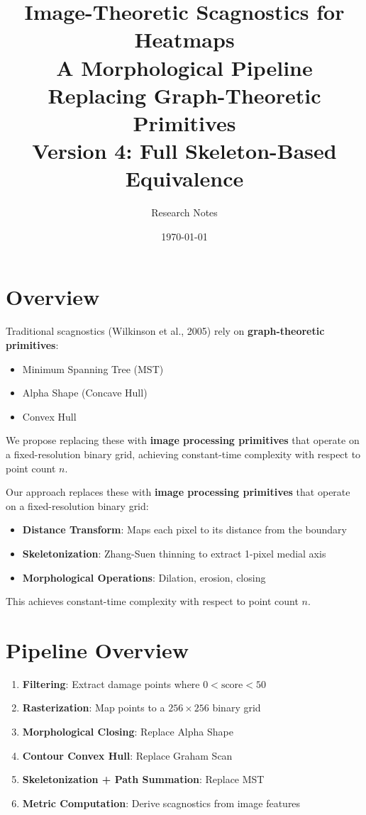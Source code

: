 \documentclass[11pt]{article}
\title{\textbf{Image-Theoretic Scagnostics for Heatmaps}\\[0.5em]
\large A Morphological Pipeline Replacing Graph-Theoretic Primitives\\[0.3em]
\normalsize Version 4: Full Skeleton-Based Equivalence}
\author{Research Notes}
\date{\today}
\begin{document}
\maketitle

\section{Overview}

Traditional scagnostics (Wilkinson et al., 2005) rely on \textbf{graph-theoretic primitives}:
\begin{itemize}
    \item Minimum Spanning Tree (MST)
    \item Alpha Shape (Concave Hull)
    \item Convex Hull
\end{itemize}

We propose replacing these with \textbf{image processing primitives} that operate on a fixed-resolution binary grid, achieving constant-time complexity with respect to point count $n$.

Our approach replaces these with \textbf{image processing primitives} that operate on a fixed-resolution binary grid:
\begin{itemize}
    \item \textbf{Distance Transform}: Maps each pixel to its distance from the boundary
    \item \textbf{Skeletonization}: Zhang-Suen thinning to extract 1-pixel medial axis
    \item \textbf{Morphological Operations}: Dilation, erosion, closing
\end{itemize}

This achieves constant-time complexity with respect to point count $n$.

\section{Pipeline Overview}

\begin{enumerate}
    \item \textbf{Filtering}: Extract damage points where $0 < \text{score} < 50$
    \item \textbf{Rasterization}: Map points to a $256 \times 256$ binary grid
    \item \textbf{Morphological Closing}: Replace Alpha Shape
    \item \textbf{Contour Convex Hull}: Replace Graham Scan
    \item \textbf{Skeletonization + Path Summation}: Replace MST
    \item \textbf{Metric Computation}: Derive scagnostics from image features
\end{enumerate}
\end{document}
